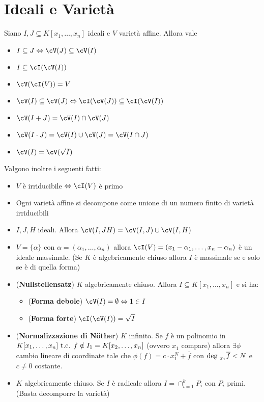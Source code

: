 \documentclass[a4paper,NoNotes,GeneralMath]{stdmdoc}
\begin{document}
	\section*{Ideali e Varietà}
	Siano $I, J \subseteq K[x_1, \ldots, x_n]$ ideali e $V$ varietà affine. Allora vale
	\begin{itemize}
		\item $I \subseteq J \sse \cV(J) \subseteq \cV(I)$
		\item $I \subseteq \cI(\cV(I))$
		\item $\cV(\cI(V)) = V$
		\item $\cV(I) \subseteq \cV(J) \sse \cI(\cV(J)) \subseteq \cI(\cV(I))$
		\item $\cV(I + J) = \cV(I) \cap \cV(J)$
		\item $\cV(I\cdot J) = \cV(I) \cup \cV(J) = \cV(I \cap J)$
		\item $\cV(I) = \cV(\sqrt{I})$
	\end{itemize}
	Valgono inoltre i seguenti fatti:
	\begin{itemize}
		\item $V$ è irriducibile $\sse \cI(V)$ è primo
		\item Ogni varietà affine si decompone come unione di un numero finito di varietà irriducibili
		\item $I, J, H$ ideali. Allora $\cV(I, JH) = \cV(I, J) \cup \cV(I, H)$
		\item $V = \{\alpha\}$ con $\alpha = (\alpha_1, \ldots, \alpha_n)$ allora $\cI(V) = (x_1 - \alpha_1, \ldots, x_n - \alpha_n)$ è un ideale massimale. (Se $K$ è algebricamente chiuso allora $I$ è massimale se e solo se è di quella forma)
		\item ({\bf Nullstellensatz}) $K$ algebricamente chiuso. Allora $I \subseteq K[x_1, \ldots, x_n]$ e si ha:
			\begin{itemize}
				\item ({\bf Forma debole}) $\cV(I) = \emptyset \sse 1 \in I$
				\item ({\bf Forma forte}) $\cI(\cV(I)) = \sqrt{I}$
			\end{itemize}
		\item ({\bf Normalizzazione di Nöther}) $K$ infinito. Se $f$ è un polinomio in $K[x_1, \ldots, x_n] \mbox{ t.c. } f \notin I_1 = K[x_2, \ldots, x_n]$ (ovvero $x_1$ compare) allora $\exists \phi$ cambio lineare di coordinate tale che $\phi(f) = c \cdot x_1^N + \overline{f}$ con $\mbox{deg }_{x_1} \overline{f} < N$ e $c \neq 0$ costante. 
		\item $K$ algebricamente chiuso. Se $I$ è radicale allora $I = \cap_{i=1}^k P_i$ con $P_i$ primi. (Basta decomporre la varietà)
	\end{itemize}
	
	
\end{document}
